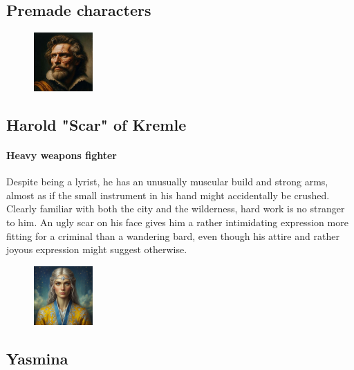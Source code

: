 \documentclass[10pt,twoside,twocolumn,openany,nodepracetedcode]{dndbook}
\begin{document}
\begin{onecolumn}
  \pagebreak

  \section{Premade characters}\label{sec:premade-characters}
  \begin{figure}
    \begin{center}
      \includegraphics[width=0.2\textwidth]{img/harold}
    \end{center}
  \end{figure}
  \subsection {Harold "Scar" of Kremle}
  \paragraph{Heavy weapons fighter}
  Despite being a lyrist, he has an unusually muscular build and strong arms, almost as if the small instrument in his hand might accidentally be crushed. Clearly familiar with both the city and the wilderness, hard work is no stranger to him. An ugly scar on his face gives him a rather intimidating expression more fitting for a criminal than a wandering bard, even though his attire and rather joyous expression might suggest otherwise.


  \begin{figure}
    \begin{center}
      \includegraphics[width=0.2\textwidth]{img/yasmina}
    \end{center}
  \end{figure}
  \subsection{Yasmina}

\end{onecolumn}
\end{document}
